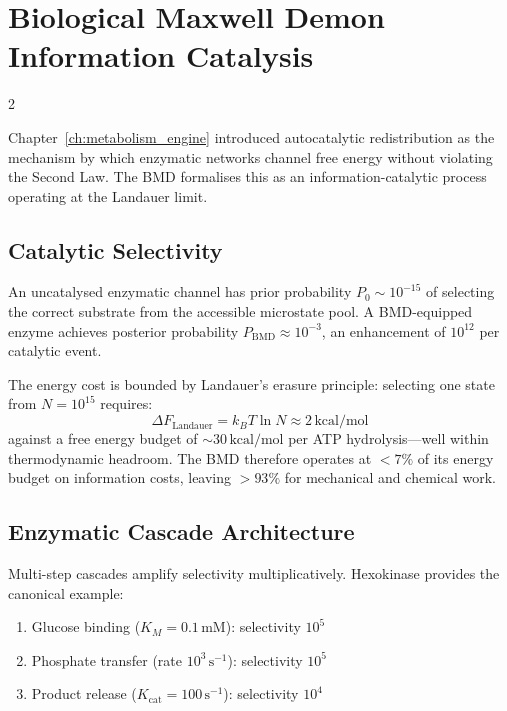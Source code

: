 \section{Biological Maxwell Demon Information Catalysis}

\begin{multicols}{2}

Chapter~\ref{ch:metabolism_engine} introduced autocatalytic redistribution as the mechanism by which enzymatic networks channel free energy without violating the Second Law. The BMD formalises this as an information-catalytic process operating at the Landauer limit.

\subsection{Catalytic Selectivity}

An uncatalysed enzymatic channel has prior probability $P_0 \sim 10^{-15}$ of selecting the correct substrate from the accessible microstate pool. A BMD-equipped enzyme achieves posterior probability $P_{\mathrm{BMD}} \approx 10^{-3}$, an enhancement of $10^{12}$ per catalytic event.

The energy cost is bounded by Landauer's erasure principle: selecting one state from $N = 10^{15}$ requires:
\begin{equation}
\Delta F_{\mathrm{Landauer}} = k_B T \ln N \approx 2\,\mathrm{kcal/mol}
\end{equation}
against a free energy budget of $\sim\!30\,\mathrm{kcal/mol}$ per ATP hydrolysis---well within thermodynamic headroom. The BMD therefore operates at $<\!7\%$ of its energy budget on information costs, leaving $>\!93\%$ for mechanical and chemical work.

\subsection{Enzymatic Cascade Architecture}

Multi-step cascades amplify selectivity multiplicatively. Hexokinase provides the canonical example:

\begin{enumerate}
\item Glucose binding ($K_M = 0.1\,\mathrm{mM}$): selectivity $10^5$
\item Phosphate transfer (rate $10^3\,\mathrm{s}^{-1}$): selectivity $10^5$
\item Product release ($K_{\mathrm{cat}} = 100\,\mathrm{s}^{-1}$): selectivity $10^4$
\end{enumerate}


\end{multicols}
